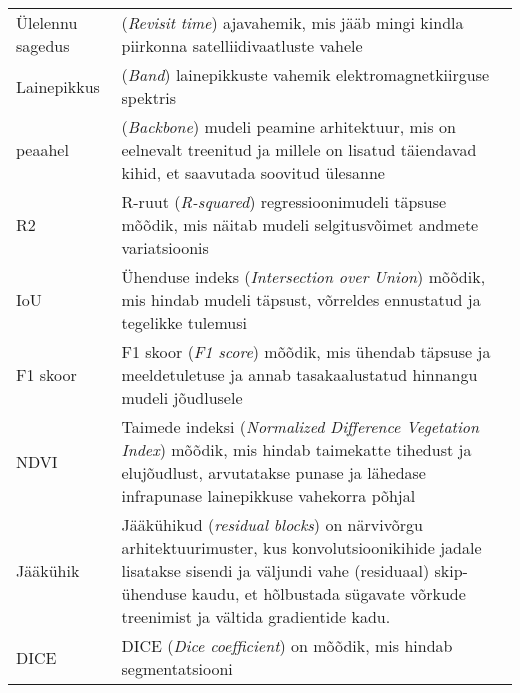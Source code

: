 \begin{longtable}{p{3cm}p{10cm}}  %
Ülelennu sagedus & (\textit{Revisit time}) ajavahemik, mis jääb mingi kindla
piirkonna satelliidivaatluste vahele\\
Lainepikkus & (\textit{Band}) lainepikkuste vahemik elektromagnetkiirguse spektris \\
peaahel & (\textit{Backbone}) mudeli peamine arhitektuur, mis on eelnevalt treenitud
ja millele on lisatud täiendavad kihid, et saavutada soovitud ülesanne\\
R2 & R-ruut (\textit{R-squared}) regressioonimudeli täpsuse mõõdik, mis näitab
mudeli selgitusvõimet andmete variatsioonis\\
IoU & Ühenduse indeks (\textit{Intersection over Union}) mõõdik, mis hindab
mudeli täpsust, võrreldes ennustatud ja tegelikke tulemusi\\
F1 skoor & F1 skoor (\textit{F1 score}) mõõdik, mis ühendab täpsuse ja
meeldetuletuse ja annab tasakaalustatud hinnangu mudeli jõudlusele\\
NDVI & Taimede indeksi (\textit{Normalized Difference Vegetation Index}) mõõdik, mis
hindab taimekatte tihedust ja elujõudlust, arvutatakse punase ja lähedase
infrapunase lainepikkuse vahekorra põhjal\\
Jääkühik & Jääkühikud (\textit{residual blocks}) on närvivõrgu arhitektuurimuster, kus konvolutsioonikihide jadale lisatakse sisendi ja väljundi vahe (residuaal) skip-ühenduse kaudu, et hõlbustada sügavate võrkude treenimist ja vältida gradientide kadu. \\
DICE & DICE (\textit{Dice coefficient}) on mõõdik, mis hindab segmentatsiooni \\
\end{longtable}
\addtocounter{table}{-1} %